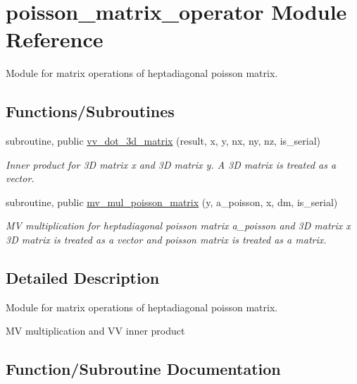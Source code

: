 \hypertarget{namespacepoisson__matrix__operator}{}\section{poisson\+\_\+matrix\+\_\+operator Module Reference}
\label{namespacepoisson__matrix__operator}


Module for matrix operations of heptadiagonal poisson matrix.  


\subsection*{Functions/\+Subroutines}
\begin{DoxyCompactItemize}
\item 
subroutine, public \hyperlink{namespacepoisson__matrix__operator_a10219d15282e48b5afab88408912fb2f}{vv\+\_\+dot\+\_\+3d\+\_\+matrix} (result, x, y, nx, ny, nz, is\+\_\+serial)
\begin{DoxyCompactList}\small\item\em Inner product for 3D matrix x and 3D matrix y. A 3D matrix is treated as a vector. \end{DoxyCompactList}\item 
subroutine, public \hyperlink{namespacepoisson__matrix__operator_a0a0591ff6a44595b830d4d0655e25106}{mv\+\_\+mul\+\_\+poisson\+\_\+matrix} (y, a\+\_\+poisson, x, dm, is\+\_\+serial)
\begin{DoxyCompactList}\small\item\em MV multiplication for heptadiagonal poisson matrix a\+\_\+poisson and 3D matrix x 3D matrix is treated as a vector and poisson matrix is treated as a matrix. \end{DoxyCompactList}\end{DoxyCompactItemize}


\subsection{Detailed Description}
Module for matrix operations of heptadiagonal poisson matrix. 

MV multiplication and VV inner product 

\subsection{Function/\+Subroutine Documentation}
\mbox{\label{namespacepoisson__matrix__operator_a0a0591ff6a44595b830d4d0655e25106}} 
